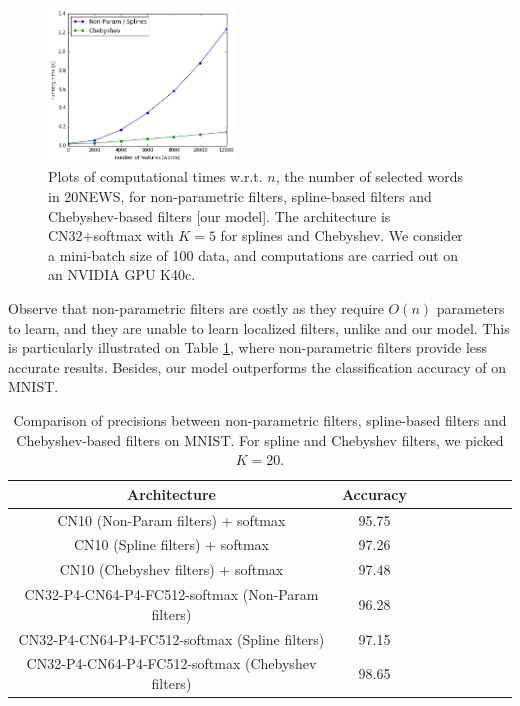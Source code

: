 \documentclass{article}
\begin{document}
\begin{figure}[h!]
\centering
\includegraphics[width=5cm]{images/speed.png}
\caption{Plots of computational times w.r.t. $n$, the number of selected words in 20NEWS, for non-parametric filters, spline-based filters \cite{art:HenaffBrunaLeCun15DLgraphs} and Chebyshev-based filters [our model]. The architecture is CN32+softmax with $K=5$ for splines and Chebyshev. We consider a mini-batch size of 100 data, and computations are carried out on an NVIDIA GPU K40c.}
\label{fig2}
\end{figure}







\noindent
Observe that non-parametric filters are costly as they require $O(n)$ parameters to learn, and they are unable to learn localized filters, unlike \cite{art:HenaffBrunaLeCun15DLgraphs} and our model. This is particularly illustrated on Table \ref{tab6}, where non-parametric filters provide less accurate results. Besides, our model outperforms the classification accuracy of \cite{art:HenaffBrunaLeCun15DLgraphs} on MNIST.


\begin{table}[h!]
 \centering
{\small
\begin{tabular}{|c|c|c|c|c|c|c|c|c|}
\hline
 Architecture & Accuracy  \\
\hline
CN10 (Non-Param filters) + softmax & 95.75 \\
CN10 (Spline filters)  + softmax & 97.26 \\
CN10 (Chebyshev filters)  + softmax & 97.48 \\
CN32-P4-CN64-P4-FC512-softmax  (Non-Param filters) & 96.28 \\
CN32-P4-CN64-P4-FC512-softmax  (Spline filters) & 97.15 \\
CN32-P4-CN64-P4-FC512-softmax  (Chebyshev filters) & 98.65 \\
\hline
\end{tabular}
}
\caption{Comparison of precisions between non-parametric filters, spline-based filters \cite{art:HenaffBrunaLeCun15DLgraphs} and Chebyshev-based filters on MNIST. For spline and Chebyshev filters, we picked $K=20$.} 
\label{tab6}
\end{table}
\end{document}
